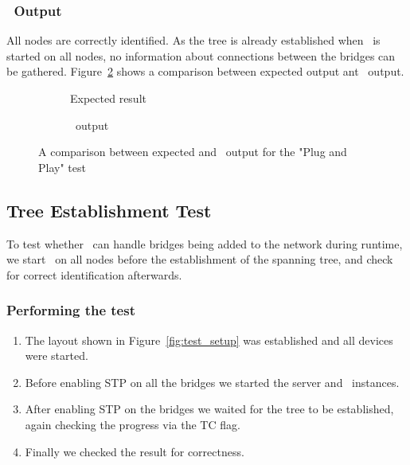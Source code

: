\subsubsection*{\tool\ Output}
All nodes are correctly identified.
As the tree is already established when \tool\ is started on all nodes, no information about connections between the bridges can be gathered.
Figure~\ref{fig:pnp} shows a comparison between expected output ant \tool\ output.
\begin{figure}[h]
    \begin{subfigure}[b]{\textwidth}
        \centering
        \caption{Expected result}
        \label{fig:pnpExp}
    \end{subfigure}
    
    \vspace{0.5cm}

    \begin{subfigure}[b]{\textwidth}
        \centering
        
        \caption{\tool\ output}
    \end{subfigure}
    \caption{A comparison between expected and \tool\ output for the "Plug and Play" test}
    \label{fig:pnp}
\end{figure}

\subsection*{Tree Establishment Test}
\label{tree_est_test}
To test whether \tool\ can handle bridges being added to the network during runtime, we start \tool\ on all nodes before the establishment of the spanning tree, and check for correct identification afterwards.

\subsubsection*{Performing the test}
\begin{enumerate}
    \item The layout shown in Figure~\ref{fig:test_setup} was established and all devices were started.
    \item Before enabling STP on all the bridges we started the server and \tool\ instances.
    \item After enabling STP on the bridges we waited for the tree to be established, again checking the progress via the TC flag.
    \item Finally we checked the result for correctness.
\end{enumerate}

